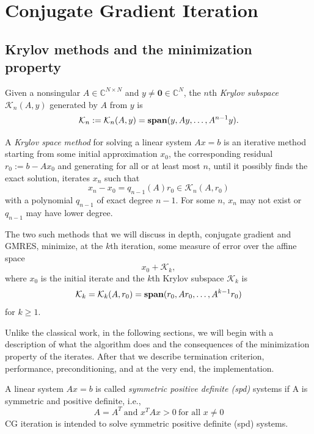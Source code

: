 \section{Conjugate Gradient Iteration}
\label{sec:2}

\subsection{Krylov methods and the minimization property}
\label{sec:2.1}

\begin{defi}
  Given a nonsingular $A\in\mathbb{C}^{N\times N}$ and $y\neq
  \mathbf{0}\in\mathbb{C}^N$, the $n$th \emph{Krylov subspace}
  $\mathcal{K}_n(A,y)$ generated by $A$ from $y$ is
  $$\mathcal{K}_n:=\mathcal{K}_n(A,y)=\text{\textbf{span}}(y,Ay,\ldots,A^{n-1}y).$$
\end{defi}

\begin{defi}
  A \emph{Krylov space method} for solving a linear system $Ax=b$ is
  an iterative method starting from some initial approximation $x_0$,
  the corresponding residual $r_0:=b-Ax_0$ and generating for
  all or at least most $n$, until it possibly finds the exact
  solution, iterates $x_n$ such that
  $$x_n-x_0=q_{n-1}(A)r_0\in \mathcal{K}_n(A,r_0)$$
  with a polynomial $q_{n-1}$ of exact degree $n-1$. For some $n$,
  $x_n$ may not exist or $q_{n-1}$ may have lower degree. 
\end{defi}

\begin{exm}
  The two such methods that we will discuss in depth, conjugate
  gradient and GMRES, minimize, at the $k$th iteration, some measure
  of error over the affine space $$x_0+\mathcal{K}_k,$$
  where $x_0$ is the initial iterate and the $k$th Krylov subspace
  $\mathcal{K}_k$
  is $$\mathcal{K}_k=\mathcal{K}_k(A,r_0)=\text{\textbf{span}}(r_0,Ar_0,
  \ldots,A^{k-1}r_0)$$
  for $k\geq 1.$
\end{exm}

\begin{rmk}
  Unlike the classical work, in the following sections, we will begin
  with a description of what the algorithm does and the consequences
  of the minimization property of the iterates. After that we describe
  termination criterion, performance, preconditioning, and at the very
  end, the implementation.
\end{rmk}


\begin{defi}
  A linear system $Ax=b$ is called \emph{symmetric positive
    definite (spd)} systems if A is symmetric and positive definite,
  i.e., $$A=A^T\ \text{and } x^TAx>0\ \text{for all } x\neq 0$$
  CG iteration is intended to solve symmetric positive definite (spd) systems.
\end{defi}

